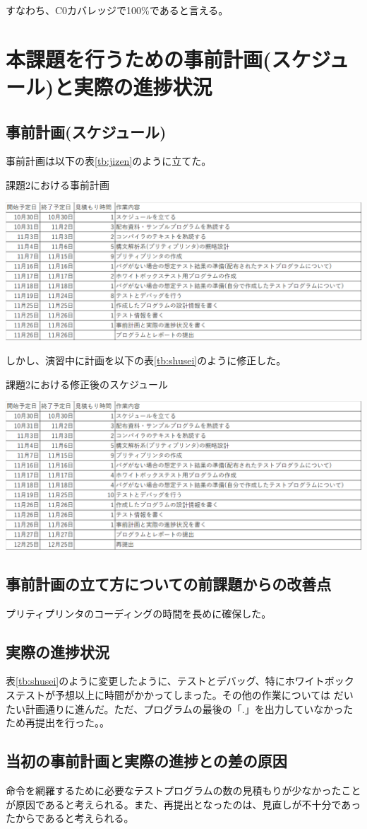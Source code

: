 \documentclass{jarticle}
\begin{document}
すなわち、C0カバレッジで100\%であると言える。
\section{本課題を行うための事前計画(スケジュール)と実際の進捗状況}
\subsection{事前計画(スケジュール)}
事前計画は以下の表\ref{tb:jizen}のように立てた。
\begin{table}[H]
\begin{center}
\caption{課題2における事前計画}
\label{tb:jizen}
\includegraphics[scale=0.6]{kadai2-jizen.png}
\end{center}
\end{table}

しかし、演習中に計画を以下の表\ref{tb:shusei}のように修正した。
\begin{table}[H]
\begin{center}
\caption{課題2における修正後のスケジュール}
\label{tb:shusei}
\includegraphics[scale=0.6]{kadai2-shusei.png}
\end{center}
\end{table}
\subsection{事前計画の立て方についての前課題からの改善点}
プリティプリンタのコーディングの時間を長めに確保した。
\subsection{実際の進捗状況}
表\ref{tb:shusei}のように変更したように、テストとデバッグ、特にホワイトボックステストが予想以上に時間がかかってしまった。その他の作業については
だいたい計画通りに進んだ。ただ、プログラムの最後の「.」を出力していなかったため再提出を行った。。
\subsection{当初の事前計画と実際の進捗との差の原因}
命令を網羅するために必要なテストプログラムの数の見積もりが少なかったことが原因であると考えられる。また、再提出となったのは、見直しが不十分であったからであると考えられる。
\end{document}
